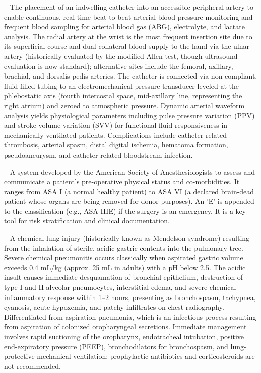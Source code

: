 -- The placement of an indwelling catheter into an accessible peripheral artery to enable continuous, real-time beat-to-beat arterial blood pressure monitoring and frequent blood sampling for arterial blood gas (ABG), electrolyte, and lactate analysis. The radial artery at the wrist is the most frequent insertion site due to its superficial course and dual collateral blood supply to the hand via the ulnar artery (historically evaluated by the modified Allen test, though ultrasound evaluation is now standard); alternative sites include the femoral, axillary, brachial, and dorsalis pedis arteries. The catheter is connected via non-compliant, fluid-filled tubing to an electromechanical pressure transducer leveled at the phlebostatic axis (fourth intercostal space, mid-axillary line, representing the right atrium) and zeroed to atmospheric pressure. Dynamic arterial waveform analysis yields physiological parameters including pulse pressure variation (PPV) and stroke volume variation (SVV) for functional fluid responsiveness in mechanically ventilated patients. Complications include catheter-related thrombosis, arterial spasm, distal digital ischemia, hematoma formation, pseudoaneurysm, and catheter-related bloodstream infection.

-- A system developed by the American Society of Anesthesiologists to assess and communicate a patient's pre-operative physical status and co-morbidities. It ranges from ASA I (a normal healthy patient) to ASA VI (a declared brain-dead patient whose organs are being removed for donor purposes). An 'E' is appended to the classification (e.g., ASA IIIE) if the surgery is an emergency. It is a key tool for risk stratification and clinical documentation.

-- A chemical lung injury (historically known as Mendelson syndrome) resulting from the inhalation of sterile, acidic gastric contents into the pulmonary tree. Severe chemical pneumonitis occurs classically when aspirated gastric volume exceeds 0.4 mL/kg (approx. 25 mL in adults) with a pH below 2.5. The acidic insult causes immediate desquamation of bronchial epithelium, destruction of type I and II alveolar pneumocytes, interstitial edema, and severe chemical inflammatory response within 1--2 hours, presenting as bronchospasm, tachypnea, cyanosis, acute hypoxemia, and patchy infiltrates on chest radiography. Differentiated from aspiration pneumonia, which is an infectious process resulting from aspiration of colonized oropharyngeal secretions. Immediate management involves rapid suctioning of the oropharynx, endotracheal intubation, positive end-expiratory pressure (PEEP), bronchodilators for bronchospasm, and lung-protective mechanical ventilation; prophylactic antibiotics and corticosteroids are not recommended.

